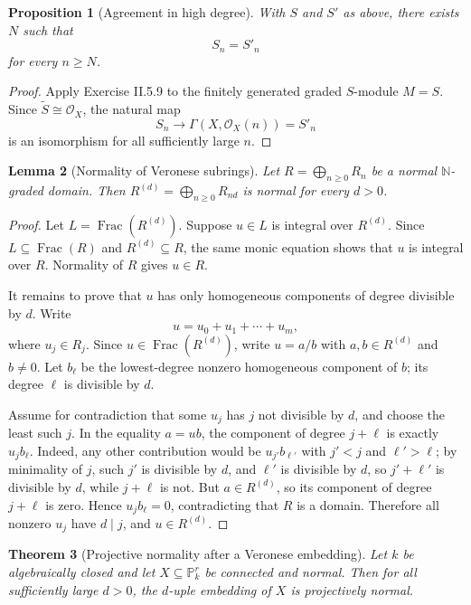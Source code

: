 \documentclass[11pt]{amsart}
\DeclareMathOperator{\Frac}{Frac}
\newcommand{\OO}{\mathcal O}
\theoremstyle{plain}
\newtheorem{theorem}{Theorem}[section]
\newtheorem{proposition}[theorem]{Proposition}
\newtheorem{lemma}[theorem]{Lemma}
\theoremstyle{definition}
\theoremstyle{remark}
\begin{document}
\begin{proposition}[Agreement in high degree]\label{prop:high-degree-agreement}
With $S$ and $S'$ as above, there exists $N$ such that
\[
  S_n = S'_n
\]
for every $n\geq N$.
\end{proposition}

\begin{proof}
Apply Exercise II.5.9 to the finitely generated graded $S$-module $M=S$.  Since $\widetilde S\cong \OO_X$, the natural map
\[
  S_n \longrightarrow \Gamma(X,\OO_X(n)) = S'_n
\]
is an isomorphism for all sufficiently large $n$.
\end{proof}

\begin{lemma}[Normality of Veronese subrings]\label{lem:veronese-normal}
Let $R=\bigoplus_{n\geq 0}R_n$ be a normal $\mathbb N$-graded domain.  Then $R^{(d)}=\bigoplus_{n\geq 0}R_{nd}$ is normal for every $d>0$.
\end{lemma}

\begin{proof}
Let $L=\Frac(R^{(d)})$.  Suppose $u\in L$ is integral over $R^{(d)}$.  Since $L\subseteq \Frac(R)$ and $R^{(d)}\subseteq R$, the same monic equation shows that $u$ is integral over $R$.  Normality of $R$ gives $u\in R$.

It remains to prove that $u$ has only homogeneous components of degree divisible by $d$.  Write
\[
  u = u_0+u_1+\cdots+u_m,
\]
where $u_j\in R_j$.  Since $u\in \Frac(R^{(d)})$, write $u=a/b$ with $a,b\in R^{(d)}$ and $b\neq 0$.  Let $b_\ell$ be the lowest-degree nonzero homogeneous component of $b$; its degree $\ell$ is divisible by $d$.

Assume for contradiction that some $u_j$ has $j$ not divisible by $d$, and choose the least such $j$.  In the equality $a=ub$, the component of degree $j+\ell$ is exactly $u_jb_\ell$.  Indeed, any other contribution would be $u_{j'}b_{\ell'}$ with $j'<j$ and $\ell'>\ell$; by minimality of $j$, such $j'$ is divisible by $d$, and $\ell'$ is divisible by $d$, so $j'+\ell'$ is divisible by $d$, while $j+\ell$ is not.  But $a\in R^{(d)}$, so its component of degree $j+\ell$ is zero.  Hence $u_jb_\ell=0$, contradicting that $R$ is a domain.  Therefore all nonzero $u_j$ have $d\mid j$, and $u\in R^{(d)}$.
\end{proof}

\begin{theorem}[Projective normality after a Veronese embedding]\label{thm:veronese-projectively-normal}
Let $k$ be algebraically closed and let $X\subseteq \mathbb P^r_k$ be connected and normal.  Then for all sufficiently large $d>0$, the $d$-uple embedding of $X$ is projectively normal.
\end{theorem}
\end{document}
